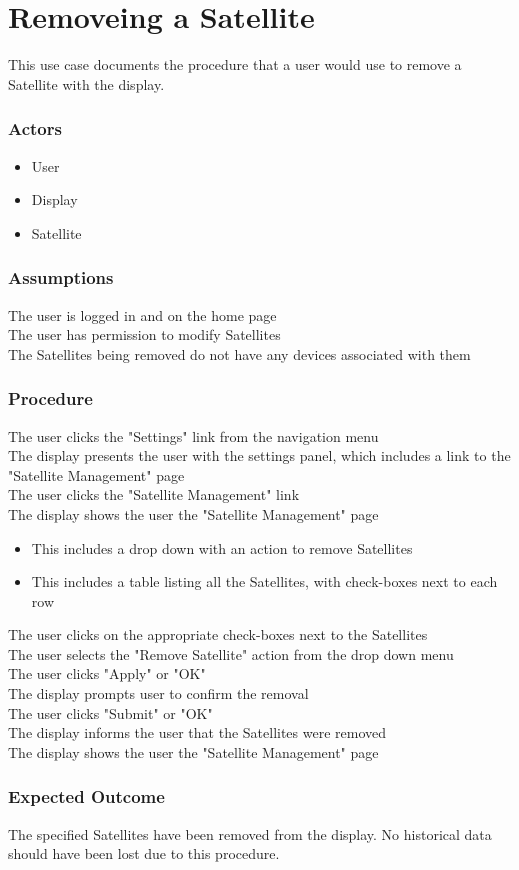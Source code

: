 \section{Removeing a Satellite}

This use case documents the procedure that a user would use to remove a Satellite with the display.

\subsubsection{Actors}
\begin{itemize}
	\item User
	\item Display
	\item Satellite
\end{itemize}

\subsubsection{Assumptions}

The user is logged in and on the home page\\
The user has permission to modify Satellites\\
The Satellites being removed do not have any devices associated with them

\subsubsection{Procedure}

The user clicks the "Settings" link from the navigation menu\\
The display presents the user with the settings panel, which includes a link to the "Satellite Management" page\\
The user clicks the "Satellite Management" link\\
The display shows the user the "Satellite Management" page
\begin{itemize}
	\item This includes a drop down with an action to remove Satellites
	\item This includes a table listing all the Satellites, with check-boxes next to each row
\end{itemize}
The user clicks on the appropriate check-boxes next to the Satellites\\
The user selects the "Remove Satellite" action from the drop down menu\\
The user clicks "Apply" or "OK"\\
The display prompts user to confirm the removal\\
The user clicks "Submit" or "OK"\\
The display informs the user that the Satellites were removed\\
The display shows the user the "Satellite Management" page

\subsubsection{Expected Outcome}

The specified Satellites have been removed from the display. 
No historical data should have been lost due to this procedure.